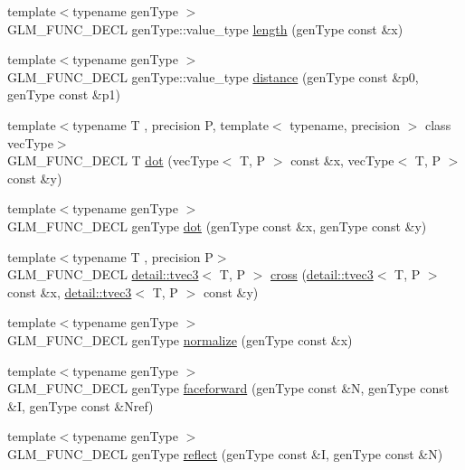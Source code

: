 \begin{DoxyCompactItemize}
\item 
{\footnotesize template$<$typename gen\-Type $>$ }\\G\-L\-M\-\_\-\-F\-U\-N\-C\-\_\-\-D\-E\-C\-L gen\-Type\-::value\-\_\-type \hyperlink{group__core__func__geometric_ga03b2831439defb8922832b540b91b8a7}{length} (gen\-Type const \&x)
\item 
{\footnotesize template$<$typename gen\-Type $>$ }\\G\-L\-M\-\_\-\-F\-U\-N\-C\-\_\-\-D\-E\-C\-L gen\-Type\-::value\-\_\-type \hyperlink{group__core__func__geometric_ga00716eae37e8ae2a76ca7799f9c75682}{distance} (gen\-Type const \&p0, gen\-Type const \&p1)
\item 
{\footnotesize template$<$typename T , precision P, template$<$ typename, precision $>$ class vec\-Type$>$ }\\G\-L\-M\-\_\-\-F\-U\-N\-C\-\_\-\-D\-E\-C\-L T \hyperlink{group__core__func__geometric_ga7dada304da2ba7dd3376ab4f178c3f6b}{dot} (vec\-Type$<$ T, P $>$ const \&x, vec\-Type$<$ T, P $>$ const \&y)
\item 
{\footnotesize template$<$typename gen\-Type $>$ }\\G\-L\-M\-\_\-\-F\-U\-N\-C\-\_\-\-D\-E\-C\-L gen\-Type \hyperlink{group__core__func__geometric_gaef767c2b0678489cb9de7a534137a86d}{dot} (gen\-Type const \&x, gen\-Type const \&y)
\item 
{\footnotesize template$<$typename T , precision P$>$ }\\G\-L\-M\-\_\-\-F\-U\-N\-C\-\_\-\-D\-E\-C\-L \hyperlink{structglm_1_1detail_1_1tvec3}{detail\-::tvec3}$<$ T, P $>$ \hyperlink{group__core__func__geometric_ga89b91c2a256cfb62ecbc589d1ee36d3c}{cross} (\hyperlink{structglm_1_1detail_1_1tvec3}{detail\-::tvec3}$<$ T, P $>$ const \&x, \hyperlink{structglm_1_1detail_1_1tvec3}{detail\-::tvec3}$<$ T, P $>$ const \&y)
\item 
{\footnotesize template$<$typename gen\-Type $>$ }\\G\-L\-M\-\_\-\-F\-U\-N\-C\-\_\-\-D\-E\-C\-L gen\-Type \hyperlink{group__core__func__geometric_ga15aa87101457e41663b08a8dcc3357f8}{normalize} (gen\-Type const \&x)
\item 
{\footnotesize template$<$typename gen\-Type $>$ }\\G\-L\-M\-\_\-\-F\-U\-N\-C\-\_\-\-D\-E\-C\-L gen\-Type \hyperlink{group__core__func__geometric_ga4bbb036ef9527ee9f67384233029ed9b}{faceforward} (gen\-Type const \&N, gen\-Type const \&I, gen\-Type const \&Nref)
\item 
{\footnotesize template$<$typename gen\-Type $>$ }\\G\-L\-M\-\_\-\-F\-U\-N\-C\-\_\-\-D\-E\-C\-L gen\-Type \hyperlink{group__core__func__geometric_gab63646fc36b81cf69d3ce123a72f76f2}{reflect} (gen\-Type const \&I, gen\-Type const \&N)

\end{DoxyCompactItemize}
